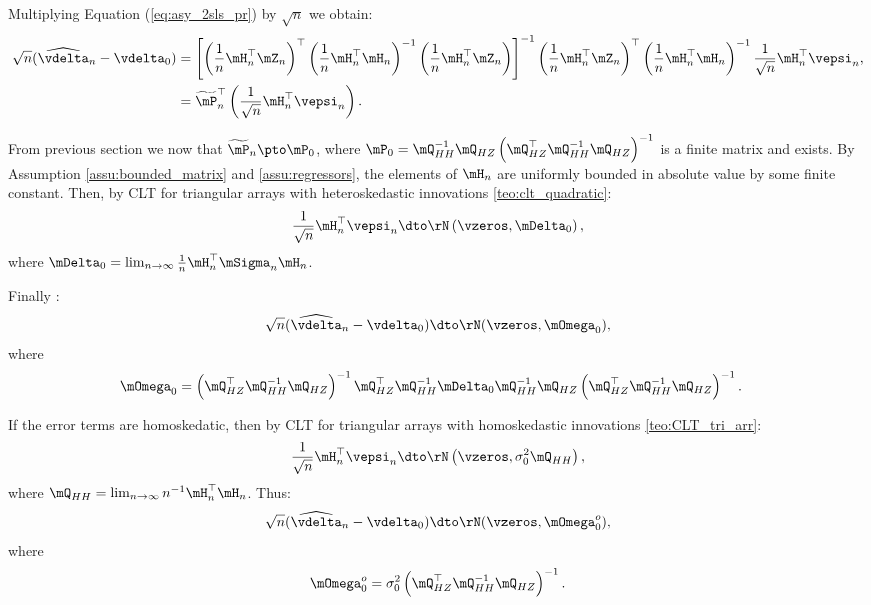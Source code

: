 \documentclass[english,12pt]{book}\usepackage[]{graphicx}\usepackage[]{xcolor}
\begin{document}
Multiplying Equation (\ref{eq:asy_2sls_pr}) by $\sqrt{n}$ we obtain:
\begin{equation}\label{eq:asy_2sls_pr2}
\begin{aligned}
\sqrt{n}(\widehat{\vdelta}_{n} - \vdelta_0) & = \left[\left(\frac{1}{n}\mH^\top_n\mZ_n\right)^\top\left(\frac{1}{n}\mH^\top_n\mH_n\right)^{-1}\left(\frac{1}{n}\mH^\top_n\mZ_n\right)\right]^{-1}\left(\frac{1}{n}\mH^\top_n\mZ_n\right)^\top\left(\frac{1}{n}\mH^\top_n\mH_n\right)^{-1}\frac{1}{\sqrt{n}}\mH^\top_n\vepsi_n, \\
             & = \widetilde{\mP}^\top_n\left(\frac{1}{\sqrt{n}}\mH^\top_n\vepsi_n\right).
\end{aligned}
\end{equation}

From previous section we now that $\widetilde{\mP}_n\pto \mP_0$, where $\mP_0=\mQ_{HH}^{-1}\mQ_{HZ}\left(\mQ_{HZ}^\top\mQ_{HH}^{-1}\mQ_{HZ}\right)^{-1}$ is a finite matrix and exists. By Assumption \ref{assu:bounded_matrix} and \ref{assu:regressors}, the elements of $\mH_n$ are uniformly bounded in absolute value by some finite constant. Then, by CLT for triangular arrays with heteroskedastic innovations \ref{teo:clt_quadratic}:
\begin{equation*}
\frac{1}{\sqrt{n}}\mH_n^\top\vepsi_n \dto \rN\left(\vzeros, \mDelta_0\right),
\end{equation*}
%
where $\mDelta_0 = \lim_{n\to\infty} \frac{1}{n}\mH^\top_n\mSigma_n\mH_n$. 

Finally :
\begin{equation*}
\sqrt{n}(\widehat{\vdelta}_{n} - \vdelta_0) \dto \rN(\vzeros, \mOmega_0), 
\end{equation*}
%
where
\begin{equation*}
  \begin{aligned}
      \mOmega_0& = \left(\mQ_{HZ}^\top\mQ_{HH}^{-1}\mQ_{HZ}\right)^{-1}\mQ_{HZ}^\top\mQ_{HH}^{-1}\mDelta_0 \mQ_{HH}^{-1}\mQ_{HZ}\left(\mQ_{HZ}^\top\mQ_{HH}^{-1}\mQ_{HZ}\right)^{-1}.
  \end{aligned}
\end{equation*}

If the error terms are homoskedatic, then by CLT for triangular arrays with homoskedastic innovations \ref{teo:CLT_tri_arr}:
\begin{equation*}
\frac{1}{\sqrt{n}}\mH_n^\top\vepsi_n \dto \rN\left(\vzeros, \sigma^2_0\mQ_{HH}\right),
\end{equation*}
%
where $\mQ_{HH} = \lim_{n \to \infty}n^{-1}\mH_n^\top\mH_n$. Thus:
\begin{equation*}
\sqrt{n}(\widehat{\vdelta}_{n} - \vdelta_0) \dto \rN(\vzeros, \mOmega_0^o),
\end{equation*}
%
where 
\begin{equation*}
\mOmega_0^o = \sigma_{0}^2\left(\mQ_{HZ}^\top\mQ_{HH}^{-1}\mQ_{HZ}\right)^{-1}.
\end{equation*}
\end{document}
